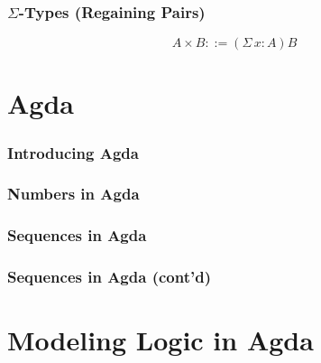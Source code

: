 \documentclass[utf8x]{beamer}
\begin{document}
\begin{frame}
\frametitle{$\Sigma$-Types (Regaining Pairs)}

$$A \times B ::= (\Sigma \, x : A)B$$

\begin{prooftree}
\end{prooftree}

\begin{prooftree}
\end{prooftree}

\begin{prooftree}
\end{prooftree}
\end{frame}



\section{Agda}

\begin{frame}
\frametitle{Introducing Agda}

\pause%
\end{frame}

\begin{frame}
\frametitle{Numbers in Agda}

\pause%
\end{frame}

\begin{frame}
\frametitle{Sequences in Agda}

\pause%
\end{frame}

\begin{frame}
\frametitle{Sequences in Agda (cont'd)}

\pause%
\end{frame}


\section{Modeling Logic in Agda}
\end{document}
